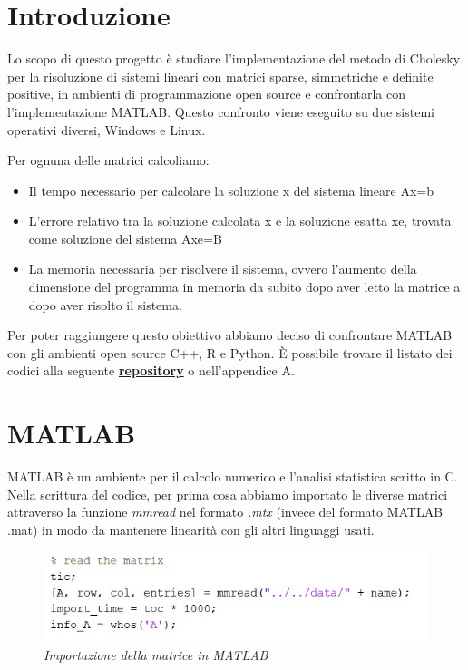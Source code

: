 \documentclass[a4paper,12pt]{article}
\begin{document}
\tableofcontents

\newpage

\section{Introduzione}
Lo scopo di questo progetto è studiare l’implementazione del metodo di Cholesky per la risoluzione di sistemi lineari con matrici sparse, simmetriche e deﬁnite positive, in ambienti di programmazione open source e confrontarla con l’implementazione MATLAB. Questo confronto viene eseguito su due sistemi operativi diversi, Windows e Linux. 
\bigskip

\noindent Per ognuna delle matrici calcoliamo:
\begin{itemize}
\item Il tempo necessario per calcolare la soluzione x del sistema lineare Ax=b
\item L’errore relativo tra la soluzione calcolata x e la soluzione esatta xe, trovata come soluzione del sistema Axe=B
\item La memoria necessaria per risolvere il sistema, ovvero l’aumento della dimensione del programma in memoria da subito dopo aver letto la matrice a dopo aver risolto il sistema.
\end{itemize} 
\bigskip

\noindent Per poter raggiungere questo obiettivo abbiamo deciso di confrontare MATLAB con gli ambienti open source C++, R e Python.
È possibile trovare il listato dei codici alla seguente \href{https://gitlab.com/okamiRvS/cholesky-computing}{\textbf{repository}} o nell'appendice A.


\newpage

\section{MATLAB}

MATLAB è un ambiente per il calcolo numerico e l’analisi statistica scritto in C. 
Nella scrittura del codice, per prima cosa abbiamo importato le diverse matrici attraverso la funzione \textit{mmread} nel formato \textit{.mtx}  (invece del formato MATLAB .mat) in modo da mantenere linearità con gli altri linguaggi usati.
\bigskip

\begin{figure}[H]
\centering
\includegraphics[width=0.6\linewidth]{img/matlab1.jpg}
\caption{\textit{Importazione della matrice in MATLAB}}
\end{figure}
\end{document}
